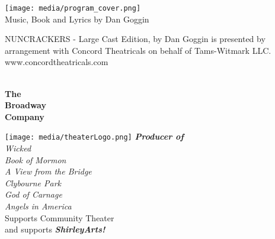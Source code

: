 \documentclass[12pt, a5paper, oneside]{article}
\begin{document}
\newcommand\song[2]{\item\raggedright\textbf{#1}\dotfill \raggedleft\emph{#2}\par}
\newcommand\cast[2]{{#2}\dotfill \emph{#1}\newline}
\newcommand\crew[2]{\raggedright\textbf{#1}\dotfill \raggedleft\emph{#2}\par}
\newcommand\choir[1]{\emph{#1}}
\newcommand\thnks[1]{\small \item{#1}}
\pagestyle{empty} %
\setlength\parindent{0em} %

\begin{center}

\texttt{[image: media/program\_cover.png]}
\\
\Large Music, Book and Lyrics by  
Dan Goggin \par
\hfill\newline
\normalsize
NUNCRACKERS - Large Cast Edition, by Dan Goggin is presented by arrangement with Concord Theatricals on behalf of Tams-Witmark LLC. \\
www.concordtheatricals.com


\end{center}
\pagebreak
\begin{minipage}[c][\textheight]{\linewidth}
\begin{framed}
\begin{center}
\begin{minipage}{0.25\linewidth}
\end{minipage}\\
\Large{\selectfont \textbf{The\\ Broadway\\ Company}}

\hfill\newline
\hspace*{11mm}\texttt{[image: media/theaterLogo.png]}
\hfill\newline
{}\selectfont
\large{\textbf{\emph{Producer of}}}\\
\hfill\newline
\normalsize\emph{Wicked\\
Book of Mormon\\
A View from the Bridge\\
Clybourne Park\\
God of Carnage\\
Angels in America\\
}
\selectfont
\hfill\newline
Supports Community Theater \\
and supports \emph{\textbf{ShirleyArts!}}
\end{center}
\end{framed}
\end{minipage}
\end{document}
